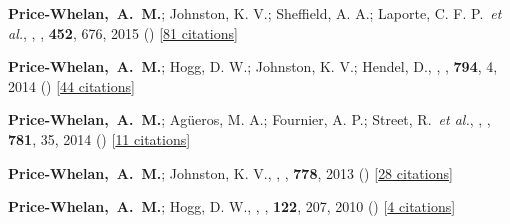 \item[{\color{deemph}\scriptsize5}]\textbf{Price-Whelan,~A.~M.}; Johnston, K. V.; Sheffield, A. A.; Laporte, C. F. P.~\textit{et al.}, , \mnras, \textbf{452}, 676, 2015 () [\href{http://adsabs.harvard.edu/abs/2015MNRAS.452..676P}{81 citations}]

\item[{\color{deemph}\scriptsize4}]\textbf{Price-Whelan,~A.~M.}; Hogg, D. W.; Johnston, K. V.; Hendel, D., , \apj, \textbf{794}, 4, 2014 () [\href{http://adsabs.harvard.edu/abs/2014ApJ...794....4P}{44 citations}]

\item[{\color{deemph}\scriptsize3}]\textbf{Price-Whelan,~A.~M.}; Ag{\"u}eros, M. A.; Fournier, A. P.; Street, R.~\textit{et al.}, , \apj, \textbf{781}, 35, 2014 () [\href{http://adsabs.harvard.edu/abs/2014ApJ...781...35P}{11 citations}]

\item[{\color{deemph}\scriptsize2}]\textbf{Price-Whelan,~A.~M.}; Johnston, K. V., , \apj, \textbf{778}, 2013 () [\href{http://adsabs.harvard.edu/abs/2013ApJ...778L..12P}{28 citations}]

\item[{\color{deemph}\scriptsize1}]\textbf{Price-Whelan,~A.~M.}; Hogg, D. W., , \pasp, \textbf{122}, 207, 2010 () [\href{http://adsabs.harvard.edu/abs/2010PASP..122..207P}{4 citations}]